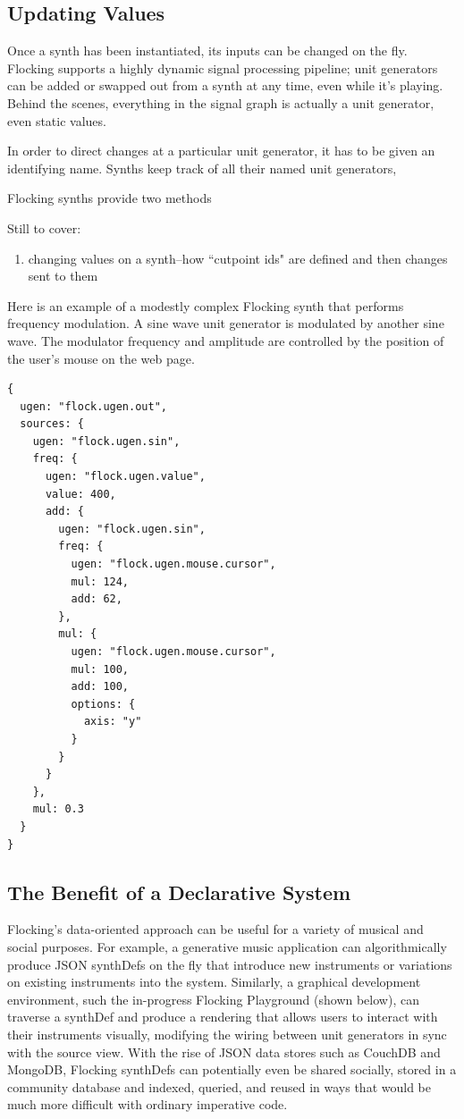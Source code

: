 \documentclass{article}
\begin{document}
\subsection{Updating Values}

Once a synth has been instantiated, its inputs can be changed on the fly. Flocking supports a highly dynamic signal processing pipeline; unit generators can be added or swapped out from a synth at any time, even while it's playing. Behind the scenes, everything in the signal graph is actually a unit generator, even static values.

In order to direct changes at a particular unit generator, it has to be given an identifying name. Synths keep track of all their named unit generators,

Flocking synths provide two methods



Still to cover:
\begin{enumerate}
\item changing values on a synth--how ``cutpoint ids" are defined and then changes sent to them
\end{enumerate}

Here is an example of a modestly complex Flocking synth that performs frequency modulation. A sine wave unit generator is modulated by another sine wave. The modulator frequency and amplitude are controlled by the position of the user's mouse on the web page.

\begin{verbatim}
{
  ugen: "flock.ugen.out",
  sources: {
    ugen: "flock.ugen.sin",
    freq: {
      ugen: "flock.ugen.value",
      value: 400,
      add: {
        ugen: "flock.ugen.sin",
        freq: {
          ugen: "flock.ugen.mouse.cursor",
          mul: 124,
          add: 62,
        },
        mul: {
          ugen: "flock.ugen.mouse.cursor",
          mul: 100,
          add: 100,
          options: {
            axis: "y"
          }
        }
      }
    },
    mul: 0.3
  }
}
\end{verbatim}

\subsection{The Benefit of a Declarative System}

Flocking's data-oriented approach can be useful for a variety of musical and social purposes. For example, a generative music application can algorithmically produce JSON synthDefs on the fly that introduce new instruments or variations on existing instruments into the system. Similarly, a graphical development environment, such the in-progress Flocking Playground (shown below), can traverse a synthDef and produce a rendering that allows users to interact with their instruments visually, modifying the wiring between unit generators in sync with the source view. With the rise of JSON data stores such as CouchDB and MongoDB, Flocking synthDefs can potentially even be shared socially, stored in a community database and indexed, queried, and reused in ways that would be much more difficult with ordinary imperative code.
\end{document}
